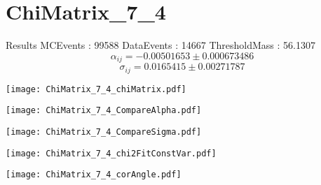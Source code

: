 \documentclass[a4paper,12pt]{article}
\begin{document}
\section{ChiMatrix\_7\_4}
\begin{minipage}{0.49\linewidth} Results \newline
MCEvents : 99588\newline
DataEvents : 14667 \newline
ThresholdMass : 56.1307\\
$$\alpha_{ij} = -0.00501653\pm 0.000673486$$
$$\sigma_{ij} = 0.0165415\pm 0.00271787$$
\end{minipage}\hfill
\begin{minipage}{0.49\linewidth} 
\texttt{[image: ChiMatrix\_7\_4\_chiMatrix.pdf]}\\
\end{minipage}
\hfill
\begin{minipage}{0.49\linewidth} 
\texttt{[image: ChiMatrix\_7\_4\_CompareAlpha.pdf]}\\
\end{minipage}
\hfill
\begin{minipage}{0.49\linewidth} 
\texttt{[image: ChiMatrix\_7\_4\_CompareSigma.pdf]}\\
\end{minipage}
\begin{minipage}{0.49\linewidth} 
\texttt{[image: ChiMatrix\_7\_4\_chi2FitConstVar.pdf]}\\
\end{minipage}
\hfill
\begin{minipage}{0.49\linewidth} 
\texttt{[image: ChiMatrix\_7\_4\_corAngle.pdf]}\\
\end{minipage}
\end{document}
